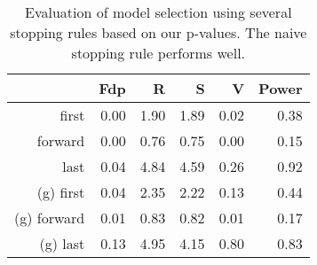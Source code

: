 \begin{table}[ht]
\centering
\begin{tabular}{rrrrrr}
  \hline
 & Fdp & R & S & V & Power \\ 
  \hline
first & 0.00 & 1.90 & 1.89 & 0.02 & 0.38 \\ 
  forward & 0.00 & 0.76 & 0.75 & 0.00 & 0.15 \\ 
  last & 0.04 & 4.84 & 4.59 & 0.26 & 0.92 \\ 
  (g) first & 0.04 & 2.35 & 2.22 & 0.13 & 0.44 \\ 
  (g) forward & 0.01 & 0.83 & 0.82 & 0.01 & 0.17 \\ 
  (g) last & 0.13 & 4.95 & 4.15 & 0.80 & 0.83 \\ 
   \hline
\end{tabular}
\caption{Evaluation of model selection using several stopping rules based on our p-values. The naive stopping rule performs well.} 
\end{table}

